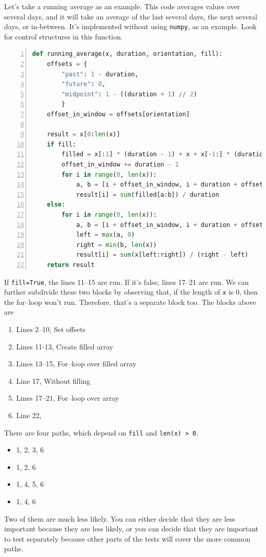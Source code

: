 \documentclass[fleqn,10pt]{olplainarticle}
\begin{document}
Let's take a running average as an example. This code
averages values over several days, and it will take an
average of the last several days, the next several days,
or in-between. It's implemented without using \lstinline|numpy|,
as an example. Look for control structures in this function.

\begin{lstlisting}[language=Python,numbers=left]
def running_average(x, duration, orientation, fill):
    offsets = {
        "past": 1 - duration,
        "future": 0,
        "midpoint": 1 - ((duration + 1) // 2)
        }
    offset_in_window = offsets[orientation]

    result = x[0:len(x)]
    if fill:
        filled = x[:1] * (duration - 1) + x + x[-1:] * (duration - 1)
        offset_in_window += duration - 1
        for i in range(0, len(x)):
            a, b = [i + offset_in_window, i + duration + offset_in_window]
            result[i] = sum(filled[a:b]) / duration
    else:
        for i in range(0, len(x)):
            a, b = [i + offset_in_window, i + duration + offset_in_window]
            left = max(a, 0)
            right = min(b, len(x))
            result[i] = sum(x[left:right]) / (right - left)
    return result
\end{lstlisting}

\noindent{}If \lstinline|fill=True|, the lines 11--15 are run.
If it's false, lines 17--21 are run. We can further subdivide
these two blocks by observing that, if the length of \lstinline|x|
is 0, then the for--loop won't run. Therefore, that's a separate
block too. The blocks above are
\begin{enumerate}
    \item Lines 2--10, Set offsets
    \item Lines 11-13, Create filled array
    \item Lines 13--15, For--loop over filled array
    \item Line 17, Without filling
    \item Lines 17--21, For--loop over array
    \item Line 22,
\end{enumerate}

There are four paths, which depend on \lstinline|fill|
and \lstinline|len(x) > 0|.
\begin{itemize}
    \item 1, 2, 3, 6
    \item 1, 2, 6
    \item 1, 4, 5, 6
    \item 1, 4, 6
\end{itemize}
Two of them are much less likely. You can either decide that
they are less important because they are less likely, or
you can decide that they are important to test separately
because other parts of the tests will cover the more common
paths.
\end{document}
